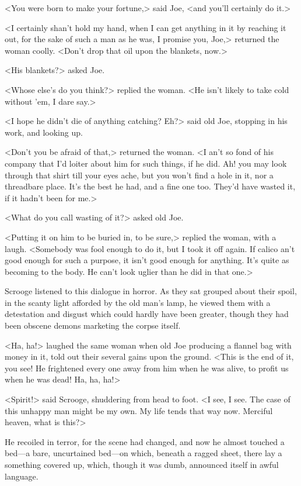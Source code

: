 <You were born to make your fortune,> said Joe, <and you'll certainly do it.>

<I certainly shan't hold my hand, when I can get anything in it by reaching it out, for the sake of such a man as he was, I promise you, Joe,> returned the woman coolly. <Don't drop that oil upon the blankets, now.>

<His blankets?> asked Joe.

<Whose else's do you think?> replied the woman. <He isn't likely to take cold without 'em, I dare say.>

<I hope he didn't die of anything catching? Eh?> said old Joe, stopping in his work, and looking up.

<Don't you be afraid of that,> returned the woman. <I an't so fond of his company that I'd loiter about him for such things, if he did. Ah! you may look through that shirt till your eyes ache, but you won't find a hole in it, nor a threadbare place. It's the best he had, and a fine one too. They'd have wasted it, if it hadn't been for me.>

<What do you call wasting of it?> asked old Joe.

<Putting it on him to be buried in, to be sure,> replied the woman, with a laugh. <Somebody was fool enough to do it, but I took it off again. If calico an't good enough for such a purpose, it isn't good enough for anything. It's quite as becoming to the body. He can't look uglier than he did in that one.>

Scrooge listened to this dialogue in horror. As they sat grouped about their spoil, in the scanty light afforded by the old man's lamp, he viewed them with a detestation and disgust which could hardly have been greater, though they had been obscene demons marketing the corpse itself.

<Ha, ha!> laughed the same woman when old Joe producing a flannel bag with money in it, told out their several gains upon the ground. <This is the end of it, you see! He frightened every one away from him when he was alive, to profit us when he was dead! Ha, ha, ha!>

<Spirit!> said Scrooge, shuddering from head to foot. <I see, I see. The case of this unhappy man might be my own. My life tends that way now. Merciful heaven, what is this?>

He recoiled in terror, for the scene had changed, and now he almost touched a bed—a bare, uncurtained bed—on which, beneath a ragged sheet, there lay a something covered up, which, though it was dumb, announced itself in awful language.

